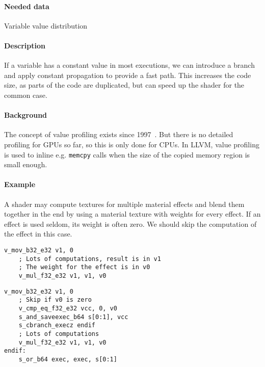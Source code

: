 \paragraph{Needed data} Variable value distribution
\paragraph{Description} If a variable has a constant value in most executions, we can introduce a branch and apply constant propagation to provide a fast path. This increases the code size, as parts of the code are duplicated, but can speed up the shader for the common case.
\paragraph{Background} The concept of value profiling exists since 1997~\cite{Calder1997}. But there is no detailed profiling for GPUs so far, so this is only done for CPUs. In LLVM, value profiling is used to inline e.g. \texttt{memcpy} calls when the size of the copied memory region is small enough.
\paragraph{Example} A shader may compute textures for multiple material effects and blend them together in the end by using a material texture with weights for every effect.
If an effect is used seldom, its weight is often zero. We should skip the computation of the effect in this case.\ \\
\begin{minipage}{.47\textwidth}
	\begin{lstlisting}[caption={Value Profiling --- unoptimized},frame=tlrb,language={[amdgpu]Assembler}]
	v_mov_b32_e32 v1, 0
	; Lots of computations, result is in v1
	; The weight for the effect is in v0
	v_mul_f32_e32 v1, v1, v0
	\end{lstlisting}
\end{minipage}\hfill
\begin{minipage}{.47\textwidth}
	\begin{lstlisting}[caption={Value Profiling --- optimized},frame=tlrb,language={[amdgpu]Assembler}]
	v_mov_b32_e32 v1, 0
	; Skip if v0 is zero
	v_cmp_eq_f32_e32 vcc, 0, v0
	s_and_saveexec_b64 s[0:1], vcc
	s_cbranch_execz endif
	; Lots of computations
	v_mul_f32_e32 v1, v1, v0
endif:
	s_or_b64 exec, exec, s[0:1]
	\end{lstlisting}
\end{minipage}

